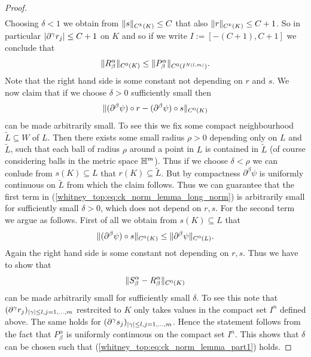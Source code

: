 \begin{proof}
\begin{align}
    \end{align} 
    Choosing $\delta < 1$ we obtain from $\lVert s\rVert_{C^k(K)} \leq C$ that also $\lVert r\rVert_{C^k(K)} \leq C + 1$. So in particular $\lvert\partial^\gamma r_j\rvert \leq C + 1$ on $K$ and so if we write $I := [-(C+1),C+1]$ we conclude that
    \[
    \lVert R_\beta^\alpha\rVert_{C^0(K)} \leq \lVert P_\beta^\alpha\rVert_{C^0(I^{N(l,m)})}.
    \]
    Note that the right hand side is some constant not depending on $r$ and $s$. We now claim that if we choose $\delta > 0$ sufficiently small then
    \[
    \lVert(\partial^\beta \psi) \circ r - (\partial^\beta \psi) \circ s\rVert_{C^0(K)}
    \]
    can be made arbitrarily small. To see this we fix some compact neighbourhood $\tilde{L} \subseteq W$ of $L$. Then there exists some small radius $\rho > 0$ depending only on $L$ and $\tilde{L}$, such that each ball of radius $\rho$ around a point in $L$ is contained in $\tilde{L}$ (of course considering balls in the metric space $\mathbb{H}^m$). Thus if we choose $\delta < \rho$ we can conlude from $s(K) \subseteq L$ that $r(K) \subseteq \tilde{L}$. But by compactness $\partial^\beta \psi$ is uniformly continuous on $\tilde{L}$ from which the claim follows. Thus we can guarantee that the first term in (\ref{whitney_top:eq:ck_norm_lemma_long_norm}) is arbitrarily small for sufficiently small $\delta >0$, which does not depend on $r, s$. For the second term we argue as follows. First of all we obtain from $s(K) \subseteq L$ that 
    \[
    \lVert(\partial^\beta \psi) \circ s\rVert_{C^0(K)} \leq \lVert\partial^\beta \psi\rVert_{C^0(L)}.
    \]
    Again the right hand side is some constant not depending on $r,s$. Thus we have to show that 
    \[
    \lVert S_\beta^\alpha - R_\beta^\alpha\rVert_{C^0(K)}
    \]
    can be made arbitrarily small for sufficiently small $\delta$. To see this note that $(\partial^\gamma r_j)_{\lvert\gamma\rvert \leq l, j = 1,\ldots,m}$ restrcited to $K$ only takes values in the compact set $I^n$ defined above. The same holds for $(\partial^\gamma s_j)_{\lvert\gamma\rvert \leq l, j = 1,\ldots,m}$. Hence the statement follows from the fact that $P_\beta^\alpha$ is uniformly continuous on the compact set $I^n$. This shows that $\delta$ can be chosen such that (\ref{whitney_top:eq:ck_norm_lemma_part1}) holds. 


\end{proof}
